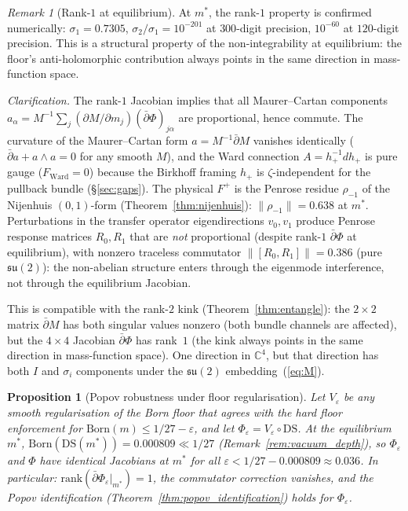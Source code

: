 \documentclass[11pt,a4paper]{article}
\newtheorem{proposition}[theorem]{Proposition}
\theoremstyle{definition}
\theoremstyle{remark}
\newtheorem{remark}[theorem]{Remark}
\newcommand{\C}{\mathbb{C}}
\newcommand{\dbar}{\bar{\partial}}
\newcommand{\su}{\mathfrak{su}}
\begin{document}
\begin{remark}[Rank-$1$ at equilibrium]
At $m^*$, the rank-$1$ property is confirmed numerically: $\sigma_1=0.7305$, $\sigma_2/\sigma_1=10^{-201}$ at $300$-digit precision, $10^{-60}$ at $120$-digit precision. This is a structural property of the non-integrability at equilibrium: the floor's anti-holomorphic contribution always points in the same direction in mass-function space.

\emph{Clarification.} The rank-$1$ Jacobian implies that all Maurer--Cartan components $a_\alpha=M^{-1}\sum_j(\partial M/\partial m_j)(\dbar\Phi)_{j\alpha}$ are proportional, hence commute. The curvature of the Maurer--Cartan form $a=M^{-1}\dbar M$ vanishes identically ($\dbar a+a\wedge a=0$ for any smooth $M$), and the Ward connection $A=h_+^{-1}dh_+$ is pure gauge ($F_{\mathrm{Ward}}=0$) because the Birkhoff framing $h_+$ is $\zeta$-independent for the pullback bundle (\S\ref{sec:gaps}). The physical $F^+$ is the Penrose residue $\rho_{-1}$ of the Nijenhuis $(0,1)$-form (Theorem~\ref{thm:nijenhuis}): $\|\rho_{-1}\|=0.638$ at $m^*$. Perturbations in the transfer operator eigendirections $v_0,v_1$ produce Penrose response matrices $R_0,R_1$ that are \emph{not} proportional (despite rank-$1$ $\dbar\Phi$ at equilibrium), with nonzero traceless commutator $\|[R_0,R_1]\|=0.386$ (pure $\su(2)$): the non-abelian structure enters through the eigenmode interference, not through the equilibrium Jacobian.

This is compatible with the rank-$2$ kink (Theorem~\ref{thm:entangle}): the $2\times 2$ matrix $\dbar M$ has both singular values nonzero (both bundle channels are affected), but the $4\times 4$ Jacobian $\dbar\Phi$ has rank~$1$ (the kink always points in the same direction in mass-function space). One direction in $\C^4$, but that direction has both $I$ and $\sigma_i$ components under the $\su(2)$ embedding~(\ref{eq:M}).
\end{remark}

\begin{proposition}[Popov robustness under floor regularisation]\label{prop:popov_robust}
Let $V_\varepsilon$ be any smooth regularisation of the Born floor that agrees with the hard floor enforcement for $\mathrm{Born}(m)\leq 1/27-\varepsilon$, and let $\Phi_\varepsilon=V_\varepsilon\circ\mathrm{DS}$. At the equilibrium $m^*$, $\mathrm{Born}(\mathrm{DS}(m^*))=0.000809\ll 1/27$ (Remark~\ref{rem:vacuum_depth}), so $\Phi_\varepsilon$ and $\Phi$ have identical Jacobians at $m^*$ for all $\varepsilon<1/27-0.000809\approx 0.036$. In particular: $\mathrm{rank}(\dbar\Phi_\varepsilon|_{m^*})=1$, the commutator correction vanishes, and the Popov identification (Theorem~\ref{thm:popov_identification}) holds for $\Phi_\varepsilon$.
\end{proposition}
\end{document}
